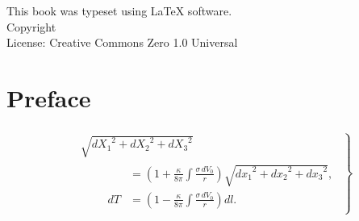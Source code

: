 \documentclass{book}
\makeatletter
\newcommand{\booklicense}{Creative Commons Zero 1.0 Universal}
\newcommand{\bookauthor}{\@author}
\makeatother
\begin{document}
\thispagestyle{empty}

\begin{flushleft}
\vspace*{\fill}
This book was typeset using \LaTeX{} software.\\
\vspace{\fill}
Copyright \textcopyright{} \the\year{}  \bookauthor\\
License: \booklicense
\end{flushleft}

\addtocounter{page}{2}

\chapter*{Preface}
\paragraph{}
\[
\left.
\begin{aligned}
  &\sqrt{{dX_{1}}^{2} + {dX_{2}}^{2} + {dX_{3}}^{2}} \\
  &\qquad
  \begin{aligned}
  &= \left(1 + \frac{\kappa}{8\pi} \int \frac{\sigma\, dV_{0}}{r}\right)
     \sqrt{{dx_{1}}^{2} + {dx_{2}}^{2} + {dx_{3}}^{2}}, \\
dT &= \left(1 - \frac{\kappa}{8\pi} \int \frac{\sigma\, dV_{0}}{r}\right) dl.
\end{aligned}
\end{aligned}
\right\}
\]


\setcounter{tocdepth}{4}
\setcounter{secnumdepth}{4}
\tableofcontents

\mainmatter




\backmatter
\end{document}
